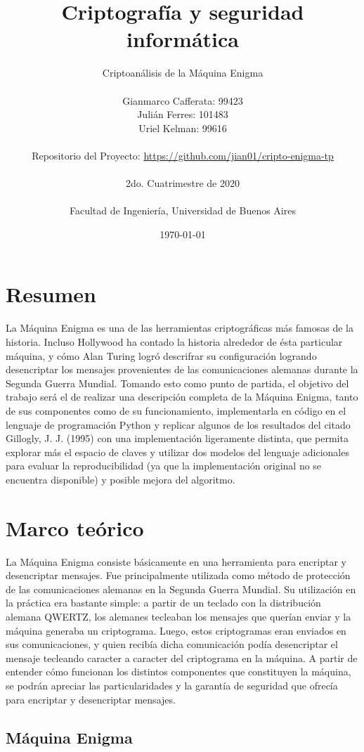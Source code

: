 \documentclass[a4paper,10pt]{article}
\title{ \Huge \textbf {Criptografía y seguridad informática}}
\author{
  \Huge Criptoanálisis de la Máquina Enigma\\
  \\
  \LARGE {Gianmarco Cafferata: 99423} \\
  \LARGE {Julián Ferres: 101483} \\
  \LARGE {Uriel Kelman: 99616} \\
  \\
  Repositorio del Proyecto: \href{https://github.com/jian01/cripto-enigma-tp}{https://github.com/jian01/cripto-enigma-tp} \\
  \\
  \LARGE   2do. Cuatrimestre de 2020 \\
  \\
  \LARGE  Facultad de Ingeniería, Universidad de Buenos Aires  \\}
\date{\today}
\begin{document}
  \maketitle
  \thispagestyle{empty}
  \newpage
  \tableofcontents
  \newpage

\section{Resumen}


La Máquina Enigma es una de las herramientas criptográficas más famosas de la historia. Incluso Hollywood ha contado la historia alrededor de ésta particular máquina, y cómo Alan Turing logró descrifrar su configuración logrando desencriptar los mensajes provenientes de las comunicaciones alemanas durante la Segunda Guerra Mundial. Tomando esto como punto de partida, el objetivo del trabajo será el de realizar una descripción completa de la Máquina Enigma, tanto de sus componentes como de su funcionamiento, implementarla en código en el lenguaje de programación Python y replicar algunos de los resultados del citado Gillogly, J. J. (1995)\cite{gillogly} con una implementación ligeramente distinta, que permita explorar más el espacio de claves y utilizar dos modelos del lenguaje adicionales para evaluar la reproducibilidad (ya que la implementación original no se encuentra disponible) y posible mejora del algoritmo.

\section{Marco teórico}

La Máquina Enigma consiste básicamente en una herramienta para encriptar y desencriptar mensajes. Fue principalmente utilizada como método de protección de las comunicaciones alemanas en la Segunda Guerra Mundial. Su utilización en la práctica era bastante simple: a partir de un teclado con la distribución alemana QWERTZ, los alemanes tecleaban los mensajes que querían enviar y la máquina generaba un criptograma. Luego, estos criptogramas eran enviados en sus comunicaciones, y quien recibía dicha comunicación podía desencriptar el mensaje tecleando caracter a caracter del criptograma en la máquina. A partir de entender cómo funcionan los distintos componentes que constituyen la máquina, se podrán apreciar las particularidades y la garantía de seguridad que ofrecía para encriptar y desencriptar mensajes.

\subsection{Máquina Enigma}
\end{document}
